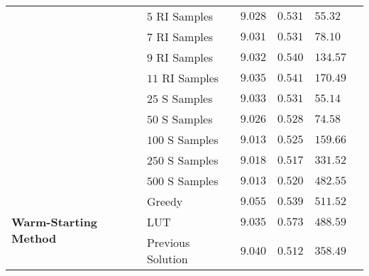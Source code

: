\begin{tabular}{l|lllll}
 & $5$ RI Samples & $9.028$ \cellcolor[gray]{0.65} & $0.531$ \cellcolor[gray]{0.775} & $55.32$ \cellcolor[gray]{0.775}  \\ 
 & $7$ RI Samples & $9.031$ \cellcolor[gray]{0.575} & $0.531$ \cellcolor[gray]{0.725} & $78.10$ \cellcolor[gray]{0.675}  \\ 
 & $9$ RI Samples & $9.032$ \cellcolor[gray]{0.55} & $0.540$ \cellcolor[gray]{0.675} & $134.57$ \cellcolor[gray]{0.625}  \\ 
 & $11$ RI Samples & $9.035$ \cellcolor[gray]{0.475} & $0.541$ \cellcolor[gray]{0.65} & $170.49$ \cellcolor[gray]{0.575}  \\ 
 & $25$ S Samples & $9.033$ \cellcolor[gray]{0.525} & $0.531$ \cellcolor[gray]{0.75} & $55.14$ \cellcolor[gray]{0.8}  \\ 
 & $50$ S Samples & $9.026$ \cellcolor[gray]{0.675} & $0.528$ \cellcolor[gray]{0.8} & $74.58$ \cellcolor[gray]{0.7}  \\ 
 & $100$ S Samples & $9.013$ \cellcolor[gray]{0.85} & $0.525$ \cellcolor[gray]{0.825} & $159.66$ \cellcolor[gray]{0.6}  \\ 
 & $250$ S Samples & $9.018$ \cellcolor[gray]{0.8} & $0.517$ \cellcolor[gray]{0.875} & $331.52$ \cellcolor[gray]{0.55}  \\ 
 & $500$ S Samples & $9.013$  \cellcolor[gray]{0.875} & $0.520$ \cellcolor[gray]{0.85} & $482.55$ \cellcolor[gray]{0.5}  \\ \hline 
\multirow{3}{*}{\textbf{Warm-Starting Method}} & Greedy & $9.055$ \cellcolor[gray]{0.4} & $0.539$ \cellcolor[gray]{0.7} & $511.52$ \cellcolor[gray]{0.45} \\ 
 & LUT & $9.035$ \cellcolor[gray]{0.5} & $0.573$ \cellcolor[gray]{0.5} & $488.59$ \cellcolor[gray]{0.475}  \\ 
 & Previous Solution & $9.040$  \cellcolor[gray]{0.425} & $0.512$ \cellcolor[gray]{0.925} & $358.49$ \cellcolor[gray]{0.525}  \\ \hline 
\end{tabular}